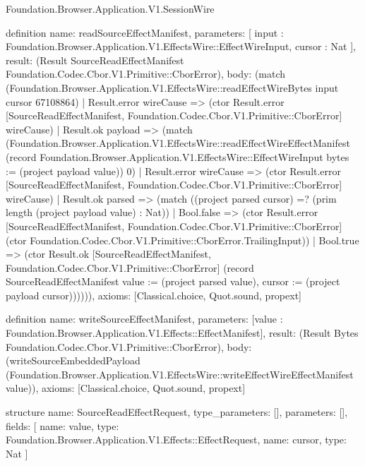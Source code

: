 \begin{lexlean}{Foundation.Browser.Application.V1.SessionWire}
\begin{semanticmodule}
definition{
  name: readSourceEffectManifest,
  parameters: [
    input : Foundation.Browser.Application.V1.EffectsWire::EffectWireInput,
    cursor : Nat
  ],
  result: (Result SourceReadEffectManifest Foundation.Codec.Cbor.V1.Primitive::CborError),
  body: (match (Foundation.Browser.Application.V1.EffectsWire::readEffectWireBytes input cursor 67108864)
    | Result.error wireCause => (ctor Result.error [SourceReadEffectManifest, Foundation.Codec.Cbor.V1.Primitive::CborError] wireCause)
    | Result.ok payload => (match (Foundation.Browser.Application.V1.EffectsWire::readEffectWireEffectManifest (record Foundation.Browser.Application.V1.EffectsWire::EffectWireInput {bytes := (project payload value)}) 0)
      | Result.error wireCause => (ctor Result.error [SourceReadEffectManifest, Foundation.Codec.Cbor.V1.Primitive::CborError] wireCause)
      | Result.ok parsed => (match ((project parsed cursor) =? (prim length (project payload value) : Nat))
        | Bool.false => (ctor Result.error [SourceReadEffectManifest, Foundation.Codec.Cbor.V1.Primitive::CborError] (ctor Foundation.Codec.Cbor.V1.Primitive::CborError.TrailingInput))
        | Bool.true => (ctor Result.ok [SourceReadEffectManifest, Foundation.Codec.Cbor.V1.Primitive::CborError] (record SourceReadEffectManifest {value := (project parsed value), cursor := (project payload cursor)}))))),
  axioms: [Classical.choice, Quot.sound, propext]
}

definition{
  name: writeSourceEffectManifest,
  parameters: [value : Foundation.Browser.Application.V1.Effects::EffectManifest],
  result: (Result Bytes Foundation.Codec.Cbor.V1.Primitive::CborError),
  body: (writeSourceEmbeddedPayload (Foundation.Browser.Application.V1.EffectsWire::writeEffectWireEffectManifest value)),
  axioms: [Classical.choice, Quot.sound, propext]
}

structure{
  name: SourceReadEffectRequest,
  type_parameters: [],
  parameters: [],
  fields: [
    {name: value, type: Foundation.Browser.Application.V1.Effects::EffectRequest},
    {name: cursor, type: Nat}
  ]
}


\end{semanticmodule}
\end{lexlean}
